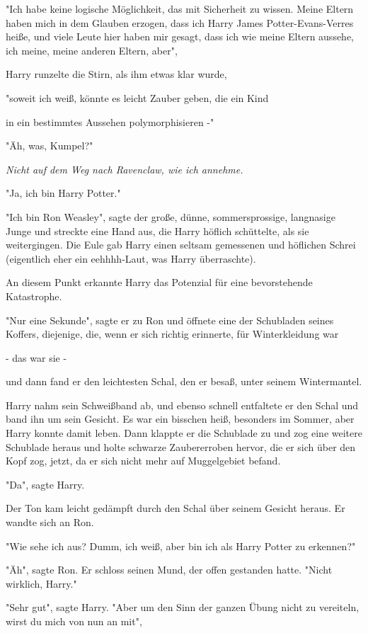 {"Ich habe keine logische Möglichkeit, das mit Sicherheit zu wissen. Meine Eltern haben mich in dem Glauben erzogen, dass ich Harry James Potter-Evans-Verres heiße, und viele Leute hier haben mir gesagt, dass ich wie meine Eltern aussehe, ich meine, meine anderen Eltern, aber",

Harry runzelte die Stirn, als ihm etwas klar wurde,

"soweit ich weiß, könnte es leicht Zauber geben, die ein Kind

in ein bestimmtes Aussehen polymorphisieren -"

"Äh, was, Kumpel?"

\emph{Nicht auf dem Weg nach Ravenclaw, wie ich annehme.}

"Ja, ich bin Harry Potter."

"Ich bin Ron Weasley", sagte der große, dünne, sommersprossige, langnasige Junge und streckte eine Hand aus, die Harry höflich schüttelte, als sie weitergingen. Die Eule gab Harry einen seltsam gemessenen und höflichen Schrei (eigentlich eher ein eehhhh-Laut, was Harry überraschte).

An diesem Punkt erkannte Harry das Potenzial für eine bevorstehende Katastrophe.

"Nur eine Sekunde", sagte er zu Ron und öffnete eine der Schubladen seines Koffers, diejenige, die, wenn er sich richtig erinnerte, für Winterkleidung war

- das war sie -

und dann fand er den leichtesten Schal, den er besaß, unter seinem Wintermantel.

Harry nahm sein Schweißband ab, und ebenso schnell entfaltete er den Schal und band ihn um sein Gesicht. Es war ein bisschen heiß, besonders im Sommer, aber Harry konnte damit leben. Dann klappte er die Schublade zu und zog eine weitere Schublade heraus und holte schwarze Zaubererroben hervor, die er sich über den Kopf zog, jetzt, da er sich nicht mehr auf Muggelgebiet befand.

"Da", sagte Harry.

Der Ton kam leicht gedämpft durch den Schal über seinem Gesicht heraus. Er wandte sich an Ron.

"Wie sehe ich aus? Dumm, ich weiß, aber bin ich als Harry Potter zu erkennen?"

"Äh", sagte Ron. Er schloss seinen Mund, der offen gestanden hatte. "Nicht wirklich, Harry."

"Sehr gut", sagte Harry. "Aber um den Sinn der ganzen Übung nicht zu vereiteln, wirst du mich von nun an mit",

}
